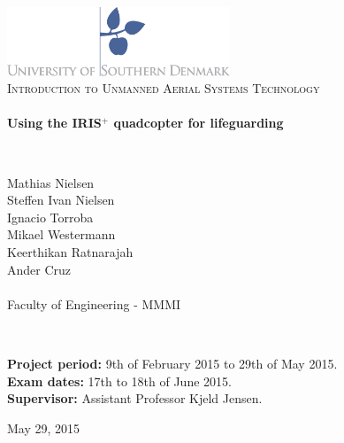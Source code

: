 \begin{titlepage}
\begin{center}

\includegraphics[width=0.5\textwidth]{./Images/logo.jpg}~\\[2cm]


\textsc{\Large Introduction to Unmanned Aerial Systems Technology}\\[1.5cm]

\HRule \\[0.4cm]
{ \huge \bfseries Using the IRIS$^{+}$ quadcopter for lifeguarding  \\[0.4cm] }

\HRule \\[1.5cm]


\begin{center}
\begin{minipage}{0.5\textwidth} 
\large 
\center
\LARGE
Mathias Nielsen\\%
\LARGE
Steffen Ivan Nielsen\\ 
\LARGE
Ignacio Torroba\\
\LARGE
Mikael Westermann \\
\LARGE
Keerthikan Ratnarajah \\ 
\LARGE
Ander Cruz \\
\large
~\\
Faculty of Engineering - MMMI

\end{minipage}
\end{center}

~\\[3cm]

\begin{flushleft}
\begin{minipage}{1\textwidth}
\large

\textbf{Project period:} 9th of February 2015 to 29th of May 2015.\\[0.3cm]
\textbf{Exam dates:} 17th to 18th of June 2015.\\[0.3cm]
\textbf{Supervisor:} Assistant Professor Kjeld Jensen.\\

\end{minipage}

\end{flushleft}

\vfill

{\large May 29, 2015}
\end{center}
\end{titlepage}
